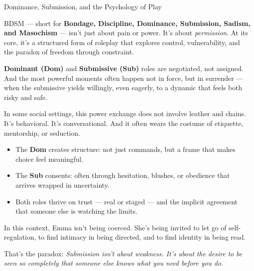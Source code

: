 \begin{TechnicalSidebar}{Dominance, Submission, and the Psychology of Play}

    BDSM — short for \textbf{Bondage, Discipline, Dominance, Submission, Sadism, and Masochism} — isn’t 
    just about pain or power.  
    It’s about \textit{permission}. At its core, it’s a structured form of roleplay that explores control, 
    vulnerability, and the paradox of freedom through constraint.
    
    \medskip
    
    \textbf{Dominant (Dom)} and \textbf{Submissive (Sub)} roles are negotiated, not assigned.  
    And the most powerful moments often happen not in force, but in surrender — when the submissive 
    yields willingly, even eagerly, to a dynamic that feels both risky and safe.
    
    \medskip
    
    In some social settings, this power exchange does not involve leather and chains.  
    It’s behavioral.  
    It’s conversational.  
    And it often wears the costume of etiquette, mentorship, or seduction.
    
    \medskip
    
    \begin{itemize}
      \item The \textbf{Dom} creates structure: not just commands, but a frame that makes choice feel 
      meaningful.
      \item The \textbf{Sub} consents: often through hesitation, blushes, or obedience that arrives 
      wrapped in uncertainty.
      \item Both roles thrive on trust --- real or staged --- and the implicit agreement that someone 
      else is watching the limits.
    \end{itemize}
    
    \medskip
    
    In this context, Emma isn’t being coerced.  
    She’s being invited to let go of self-regulation, to find intimacy in being directed, and to find 
    identity in being read.
    
    \medskip
    
    That’s the paradox:  
    \textit{Submission isn’t about weakness. It’s about the desire to be seen so completely that 
    someone else knows what you need before you do.}
    
\end{TechnicalSidebar}

